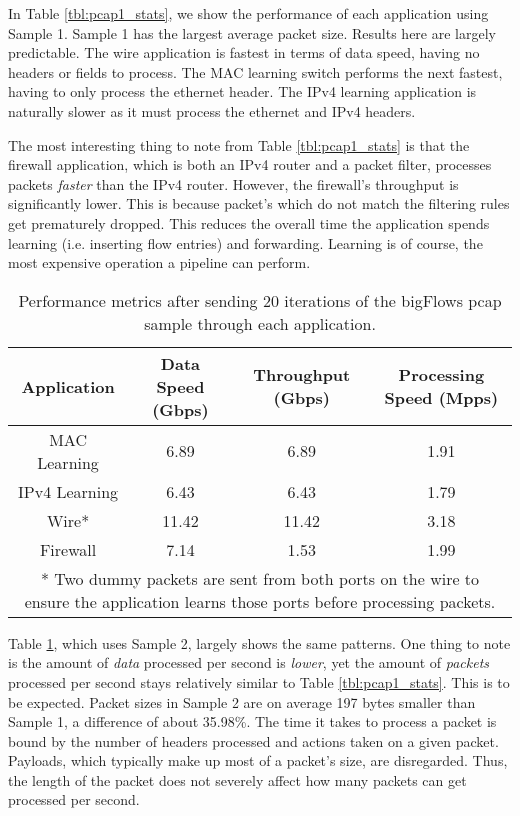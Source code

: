 In Table \ref{tbl:pcap1_stats}, we show the performance of each application using Sample 1. Sample 1 has the largest average packet size. Results here are largely predictable. The wire application is fastest in terms of data speed, having no headers or fields to process. The MAC learning switch performs the next fastest, having to only process the ethernet header. The IPv4 learning application is naturally slower as it must process the ethernet and IPv4 headers.

The most interesting thing to note from Table \ref{tbl:pcap1_stats} is that the firewall application, which is both an IPv4 router and a packet filter, processes packets \textit{faster} than the IPv4 router. However, the firewall's throughput is significantly lower. This is because packet's which do not match the filtering rules get prematurely dropped. This reduces the overall time the application spends learning (i.e. inserting flow entries) and forwarding. Learning is of course, the most expensive operation a pipeline can perform.

\begin{table}
\caption{Performance metrics after sending 20 iterations of the bigFlows pcap sample through each application.}
\begin{center}
\begin{tabular}{| c || c | c | c | }
\hline
Application & Data Speed (Gbps) & Throughput (Gbps) & Processing Speed (Mpps)  \\
\hline
MAC Learning & 6.89 & 6.89 & 1.91  \\
\hline
IPv4 Learning & 6.43 & 6.43 & 1.79  \\
\hline 
Wire* & 11.42 & 11.42 & 3.18 \\
\hline
Firewall & 7.14 & 1.53 & 1.99 \\
\hline
\multicolumn{4}{p{\linewidth}}{* Two dummy packets are sent from both ports on the wire to ensure the application learns those ports before processing packets.}
\end{tabular}
\end{center}
\label{tbl:pcap2_stats}
\end{table}

Table \ref{tbl:pcap2_stats}, which uses Sample 2, largely shows the same patterns. One thing to note is the amount of \textit{data} processed per second is \textit{lower}, yet the amount of \textit{packets} processed per second stays relatively similar to Table \ref{tbl:pcap1_stats}. This is to be expected. Packet sizes in Sample 2 are on average 197 bytes smaller than Sample 1, a difference of about 35.98\%. The time it takes to process a packet is bound by the number of headers processed and actions taken on a given packet. Payloads, which typically make up most of a packet's size, are disregarded. Thus, the length of the packet does not severely affect how many packets can get processed per second. 

